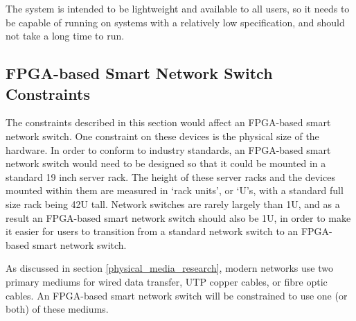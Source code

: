 The system is intended to be lightweight and available to all users, so it needs to be capable of running on systems with a relatively low specification, and should not take a long time to run.

\subsection{FPGA-based Smart Network Switch Constraints}
The constraints described in this section would affect an FPGA-based smart network switch. One constraint on these devices is the physical size of the hardware. In order to conform to industry standards, an FPGA-based smart network switch would need to be designed so that it could be mounted in a standard 19 inch server rack.
The height of these server racks and the devices mounted within them are measured in `rack units', or `U's, with a standard full size rack being 42U tall.
Network switches are rarely largely than 1U, and as a result an FPGA-based smart network switch should also be 1U, in order to make it easier for users to transition from a standard network switch to an FPGA-based smart network switch.

As discussed in section \ref{physical_media_research}, modern networks use two primary mediums for wired data transfer, UTP copper cables, or fibre optic cables. An FPGA-based smart network switch will be constrained to use one (or both) of these mediums.


